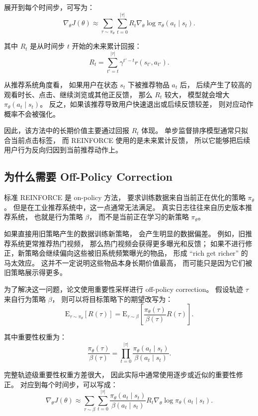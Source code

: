 \documentclass[11pt]{ctexart}
\begin{document}
展开到每个时间步，可写为：
\[
\nabla_{\theta}J(\theta)
\approx
\sum_{\tau\sim \pi_{\theta}}
\sum_{t=0}^{|\tau|}
R_t
\nabla_{\theta}
\log \pi_{\theta}(a_t\mid s_t).
\]

其中 $R_t$ 是从时间步 $t$ 开始的未来累计回报：
\[
R_t
=
\sum_{t'=t}^{|\tau|}
\gamma^{t'-t}r(s_{t'},a_{t'}).
\]

从推荐系统角度看，
如果用户在状态 $s_t$ 下被推荐物品 $a_t$ 后，
后续产生了较高的观看时长、点击、继续浏览或其他正反馈，
那么 $R_t$ 较大，
模型就会增大 $\pi_{\theta}(a_t\mid s_t)$。
反之，如果该推荐导致用户快速退出或后续反馈较差，
则对应动作概率不会被强化。

因此，该方法中的长期价值主要通过回报 $R_t$ 体现。
单步监督排序模型通常只拟合当前点击标签，
而 REINFORCE 使用的是未来累计反馈，
所以它能够把后续用户行为反向归因到当前推荐动作上。

\subsection{为什么需要 Off-Policy Correction}

标准 REINFORCE 是 on-policy 方法，
要求训练数据来自当前正在优化的策略 $\pi_{\theta}$。
但是在工业推荐系统中，这一点通常无法满足。
真实日志往往来自历史版本推荐系统，
也就是行为策略 $\beta$，
而不是当前正在学习的新策略 $\pi_{\theta}$。

如果直接用旧策略产生的数据训练新策略，
会产生明显的数据偏差。
例如，旧推荐系统更常推荐热门视频，
那么热门视频会获得更多曝光和反馈；
如果不进行修正，新策略会继续偏向这些被旧系统频繁曝光的物品，
形成 ``rich get richer'' 的马太效应。
这并不一定说明这些物品本身长期价值最高，
而可能只是因为它们被旧策略展示得更多。

为了解决这一问题，论文使用重要性采样进行 off-policy correction。
假设轨迹 $\tau$ 来自行为策略 $\beta$，
则可以将目标策略下的期望改写为：
\[
\mathrm{E}_{\tau\sim \pi_{\theta}}
\left[
R(\tau)
\right]
=
\mathrm{E}_{\tau\sim \beta}
\left[
\frac{\pi_{\theta}(\tau)}{\beta(\tau)}
R(\tau)
\right].
\]

其中重要性权重为：
\[
\frac{\pi_{\theta}(\tau)}{\beta(\tau)}
=
\prod_{t=0}^{|\tau|}
\frac{
\pi_{\theta}(a_t\mid s_t)
}{
\beta(a_t\mid s_t)
}.
\]

完整轨迹级重要性权重方差很大，
因此实际中通常使用逐步或近似的重要性修正。
对应到每个时间步，可以写成：
\[
\nabla_{\theta}J(\theta)
\approx
\sum_{\tau\sim \beta}
\sum_{t=0}^{|\tau|}
\frac{
\pi_{\theta}(a_t\mid s_t)
}{
\beta(a_t\mid s_t)
}
R_t
\nabla_{\theta}
\log \pi_{\theta}(a_t\mid s_t).
\]
\end{document}

